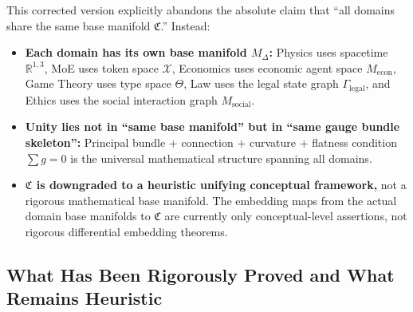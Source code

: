 \documentclass[12pt,a4paper]{article}
\theoremstyle{plain}
\theoremstyle{definition}
\newcommand{\R}{\mathbb{R}}
\newcommand{\ClaimSpace}{\mathfrak{C}}
\begin{document}
This corrected version explicitly abandons the absolute claim that ``all domains share the same base manifold $\ClaimSpace$.'' Instead:

\begin{scxbox}
\begin{itemize}
    \item \textbf{Each domain has its own base manifold $M_\Delta$:}
    Physics uses spacetime $\R^{1,3}$, MoE uses token space $\mathcal{X}$,
    Economics uses economic agent space $M_{\text{econ}}$, Game Theory uses type space $\Theta$,
    Law uses the legal state graph $\Gamma_{\text{legal}}$, and Ethics uses the social interaction graph $M_{\text{social}}$.
    
    \item \textbf{Unity lies not in ``same base manifold'' but in ``same gauge bundle skeleton'':}
    Principal bundle + connection + curvature + flatness condition $\sum g = 0$ is the universal mathematical structure spanning all domains.
    
    \item \textbf{$\ClaimSpace$ is downgraded to a heuristic unifying conceptual framework,} not a rigorous mathematical base manifold.
    The embedding maps from the actual domain base manifolds to $\ClaimSpace$ are currently only conceptual-level assertions,
    not rigorous differential embedding theorems.
\end{itemize}
\end{scxbox}

\subsection{What Has Been Rigorously Proved and What Remains Heuristic}
\end{document}
